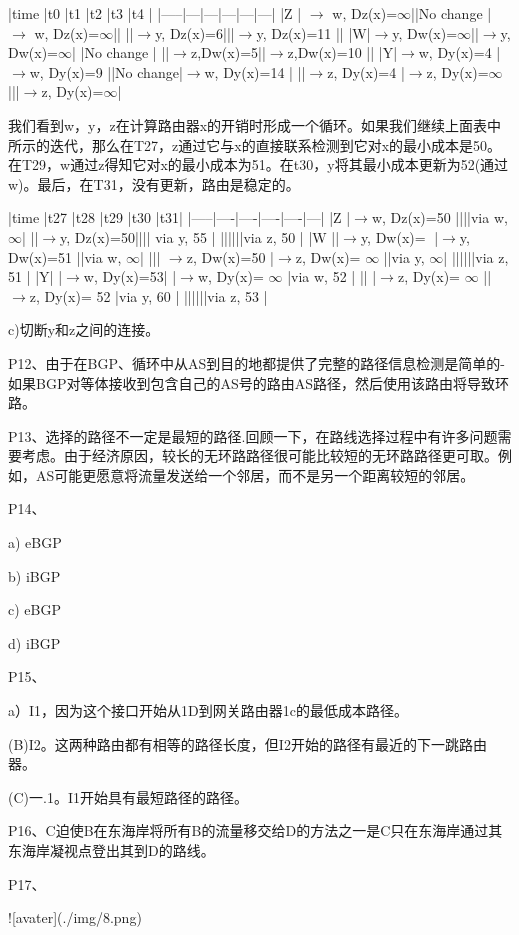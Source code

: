 \documentclass[11pt,UTF8,twoside]{article}
\begin{document}
	|time |t0 |t1 |t2 |t3 |t4 |
	|-----|---|---|---|---|---|
	|Z | $\to$ w, Dz(x)=$\infty$||No change |$\to$ w, Dz(x)=$\infty$||
	||$\to$y, Dz(x)=6|||$\to$y, Dz(x)=11 ||
	|W|$\to$y, Dw(x)=$\infty$||$\to$y, Dw(x)=$\infty$| |No change |
	||$\to$z,Dw(x)=5||$\to$z,Dw(x)=10 ||
	|Y|$\to$w, Dy(x)=4 |$\to$w, Dy(x)=9 ||No change|$\to$w, Dy(x)=14 |
	||$\to$z, Dy(x)=4 |$\to$z, Dy(x)=$\infty$|||$\to$z, Dy(x)=$\infty$|
	
	我们看到w，y，z在计算路由器x的开销时形成一个循环。如果我们继续上面表中所示的迭代，那么在T27，z通过它与x的直接联系检测到它对x的最小成本是50。在T29，w通过z得知它对x的最小成本为51。在t30，y将其最小成本更新为52(通过w)。最后，在T31，没有更新，路由是稳定的。
	
	|time |t27 |t28 |t29 |t30 |t31|
	|-----|----|----|----|----|---|
	|Z |$\to$w, Dz(x)=50 ||||via w, $\infty$|
	||$\to$y, Dz(x)=50|||| via y, 55 |
	||||||via z, 50 |
	|W ||$\to$y, Dw(x)= |$\to$y, Dw(x)=51 ||via w, $\infty$|
	||| $\to$z, Dw(x)=50 |$\to$z, Dw(x)= $\infty$ ||via y, $\infty$|
	||||||via z, 51 |
	|Y| |$\to$w, Dy(x)=53| |$\to$w, Dy(x)= $\infty$ |via w, 52 |
	|| |$\to$z, Dy(x)= $\infty$ ||$\to$z, Dy(x)= 52 |via y, 60 |
	||||||via z, 53 |
	
	c)切断y和z之间的连接。
	
	P12、由于在BGP、循环中从AS到目的地都提供了完整的路径信息检测是简单的-如果BGP对等体接收到包含自己的AS号的路由AS路径，然后使用该路由将导致环路。
	
	P13、选择的路径不一定是最短的路径.回顾一下，在路线选择过程中有许多问题需要考虑。由于经济原因，较长的无环路路径很可能比较短的无环路路径更可取。例如，AS可能更愿意将流量发送给一个邻居，而不是另一个距离较短的邻居。
	
	P14、
	
	a) eBGP 
	
	b) iBGP 
	
	c) eBGP 
	
	d) iBGP 
	
	
	P15、
	
	a）I1，因为这个接口开始从1D到网关路由器1c的最低成本路径。
	
	(B)I2。这两种路由都有相等的路径长度，但I2开始的路径有最近的下一跳路由器。
	
	(C)一.1。I1开始具有最短路径的路径。
	
	P16、C迫使B在东海岸将所有B的流量移交给D的方法之一是C只在东海岸通过其东海岸凝视点登出其到D的路线。
	
	P17、
	
	![avater](./img/8.png)
	
\end{document}
